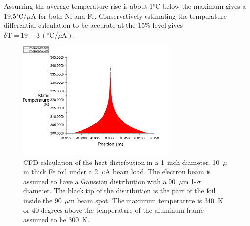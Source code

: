 \documentclass[12pt]{article}
\begin{document}
Assuming the average temperature rise is about 1$^{\circ}$C below the maximum gives a 19.5$^{\circ}\textrm{C}/\mu$A for both Ni and Fe. Conservatively estimating the temperature differential calculation to be accurate at the 15\% level gives $\delta\textrm{T}=19\pm3~(^{\circ}\textrm{C}/\mu\textrm{A})$.

\begin{figure}[h]
\centering
\includegraphics[width=0.7\textwidth]{target_heating_Fe.jpg}
\caption{CFD calculation of the heat distribution in a 1~inch diameter, 10~$\mu$m thick Fe foil under a 2~$\mu$A beam load. The electron beam is assumed to have a Gaussian distribution with a 90~$\mu$m 1-$\sigma$ diameter. The black tip of the distribution is the part of the foil inside the 90~$\mu$m beam spot. The maximum temperature is 340~K or 40 degrees above the temperature of the aluminum frame assumed to be 300~K.}
\label{fig:target_heating}
\end{figure}
\end{document}
